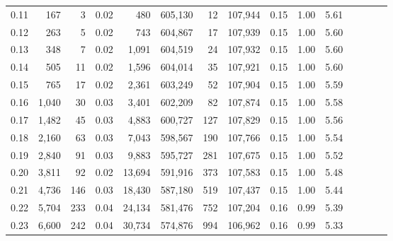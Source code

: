 \begin{tabular}{rrrcrrrrrrrrrrr}
0.11 &     167 &      3 &                                       0.02 &      480 &  605,130 &       12 &  107,944 &  0.15 &  1.00 &                         5.61 \\
0.12 &     263 &      5 &                                       0.02 &      743 &  604,867 &       17 &  107,939 &  0.15 &  1.00 &                         5.60 \\
0.13 &     348 &      7 &                                       0.02 &    1,091 &  604,519 &       24 &  107,932 &  0.15 &  1.00 &                         5.60 \\
0.14 &     505 &     11 &                                       0.02 &    1,596 &  604,014 &       35 &  107,921 &  0.15 &  1.00 &                         5.60 \\
0.15 &     765 &     17 &                                       0.02 &    2,361 &  603,249 &       52 &  107,904 &  0.15 &  1.00 &                         5.59 \\
0.16 &   1,040 &     30 &                                       0.03 &    3,401 &  602,209 &       82 &  107,874 &  0.15 &  1.00 &                         5.58 \\
0.17 &   1,482 &     45 &                                       0.03 &    4,883 &  600,727 &      127 &  107,829 &  0.15 &  1.00 &                         5.56 \\
0.18 &   2,160 &     63 &                                       0.03 &    7,043 &  598,567 &      190 &  107,766 &  0.15 &  1.00 &                         5.54 \\
0.19 &   2,840 &     91 &                                       0.03 &    9,883 &  595,727 &      281 &  107,675 &  0.15 &  1.00 &                         5.52 \\
0.20 &   3,811 &     92 &                                       0.02 &   13,694 &  591,916 &      373 &  107,583 &  0.15 &  1.00 &                         5.48 \\
0.21 &   4,736 &    146 &                                       0.03 &   18,430 &  587,180 &      519 &  107,437 &  0.15 &  1.00 &                         5.44 \\
0.22 &   5,704 &    233 &                                       0.04 &   24,134 &  581,476 &      752 &  107,204 &  0.16 &  0.99 &                         5.39 \\
0.23 &   6,600 &    242 &                                       0.04 &   30,734 &  574,876 &      994 &  106,962 &  0.16 &  0.99 &                         5.33 \\

\end{tabular}
